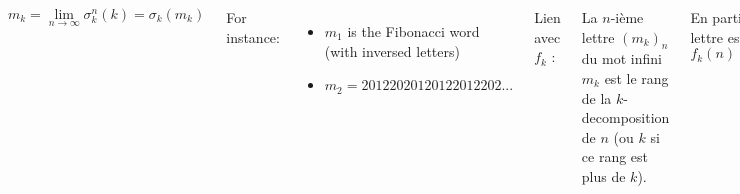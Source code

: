 \documentclass[portrait]{tikzposter}
\begin{document}
\begin{columns}
{{$$m_k = \lim_{n\to\infty} \sigma_k^n(k) = \sigma_k(m_k) $$
}

\hspace{1cm}

For instance:
\begin{itemize}
\item $m_1$ is the Fibonacci word (with inversed letters)
\item $m_2 = 20122020120122012202...$
\end{itemize}

\hspace{1cm}


\hspace{1cm}


\hspace{1cm}


\hspace{1cm}

Lien avec $f_k$ :

La $n$-ième lettre $(m_k)_n$ du mot infini $m_k$ est le rang de la
$k$-decomposition de $n$ (ou $k$ si ce rang est plus de $k$).

En particulier cette lettre est 0 si $f_k(n)=f_k(n+1)$

En cumulant : le nombre de 0 dans $m_k$ entre 0 et $n$ est $n-f_k(n)$.

Plus généralement, compter les lettres au dessus de $p$ donne
$f_k^{(p)}$. En particulier le nombre de $k$ est $f_k^{(k)}$.

}%

\end{columns}
\end{document}
